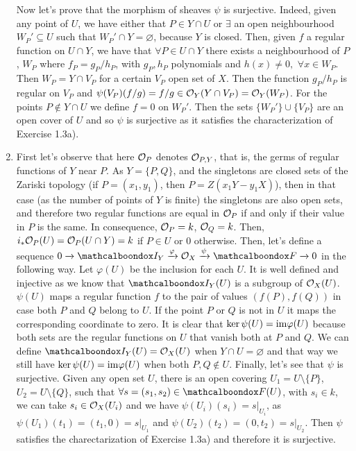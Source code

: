 \begin{sol}
\begin{enumerate}[label = \alph*)]
		Now let's prove that the morphism of sheaves $\psi$ is surjective. Indeed, given any point of $U$, we have either that $P \in Y \cap U$ or $\exists$ an open neighbourhood $W_P' \subseteq U$ such that $W_P' \cap Y = \varnothing$, because $Y$ is closed. Then, given $f$ a regular function on $U \cap Y$, we have that $\forall P \in U \cap Y$ there exists a neighbourhood of $P$, $W_P$ where $f_P = g_P/h_P$, with $g_P,h_P$ polynomials and $h(x) \neq 0, \, \, \forall x \in W_P$. Then $W_P = Y \cap V_P$ for a certain $V_P$ open set of $X$. Then the function $g_P/h_P$ is regular on $V_P$ and $\psi(V_P)(f/g) = f/g \in \mathcal{O}_Y(Y \cap V_P) = \mathcal{O}_Y(W_P)$. For the points $P \notin Y \cap U$ we define $f = 0$ on $W_P'$. Then the sets $\{W_P'\} \cup \{V_P\}$ are an open cover of $U$ and so $\psi$ is surjective as it satisfies the characterization of Exercise 1.3a).

		\item First let's observe that here $\mathcal{O}_P$ denotes $\mathcal{O}_{P,Y}$, that is, the germs of regular functions of $Y$ near $P$. As $Y = \{P,Q\}$, and the singletons are closed sets of the Zariski topology (if $P = (x_1,y_1)$, then $P = Z(x_1Y-y_1X)$), then in that case (as the number of points of $Y$ is finite) the singletons are also open sets, and therefore two regular functions are equal in $\mathcal{O}_P$ if and only if their value in $P$ is the same. In consequence, $\mathcal{O}_P = k$, $\mathcal{O}_Q = k$. Then, $i_*\mathcal{O}_P(U) = \mathcal{O}_P(U \cap Y) = k$ if $P \in U$ or 0 otherwise. Then, let's define a sequence $0 \xrightarrow{} \sI_Y \xrightarrow{\varphi} \locO_X \xrightarrow{\psi} \sF \xrightarrow{} 0$ in the following way.
		Let $\varphi(U)$ be the inclusion for each $U$. It is well defined and injective as we know that $\sI_Y(U)$ is a subgroup of $\mathcal{O}_X(U)$. $\psi(U)$ maps a regular function $f$ to the pair of values $(f(P),f(Q))$ in case both $P$ and $Q$ belong to $U$. If the point $P$ or $Q$ is not in $U$ it maps the corresponding coordinate to zero. It is clear that $\ker \psi(U) = \mathrm{im} \varphi(U)$ because both sets are the regular functions on $U$ that vanish both at $P$ and $Q$. We can define $\sI_Y(U) = \locO_X(U)$ when $Y \cap U = \varnothing$ and that way we still have $\ker \psi(U) = \mathrm{im} \varphi(U)$ when both $P,Q \notin U$. Finally, let's see that $\psi$ is surjective. Given any open set $U$, there is an open covering $U_1 = U \setminus \{P\}$, $U_2 = U \setminus \{Q\}$, such that $\forall s = (s_1, s_2) \in \sF(U)$, with $s_i \in k$, we can take $s_i \in \mathcal{O}_X(U_i)$ and we have $\psi(U_i)(s_i) = s|_{U_i}$, as $\psi(U_1)(t_1) = (t_1,0) = s|_{U_1}$ and $\psi(U_2)(t_2) = (0,t_2) = s|_{U_2}$. Then $\psi$ satisfies the charectarization of Exercise 1.3a) and therefore it is surjective.


\end{enumerate}
\end{sol}
